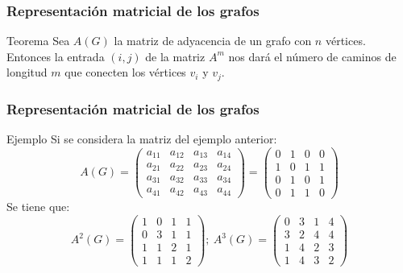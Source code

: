 \documentclass{beamer}
\begin{document}
\begin{frame}
\frametitle{Representaci\'on matricial de los grafos}
\begin{block}{Teorema}
Sea $A(G)$ la matriz de adyacencia de un grafo con $n$ v\'ertices. Entonces la entrada $(i,j)$ de la matriz $A^m$ nos dar\'a el n\'umero de caminos de longitud $m$ que conecten los v\'ertices $v_i$ y $v_j$.  
\end{block}
\end{frame}




\begin{frame}
\frametitle{Representaci\'on matricial de los grafos}
\begin{block}{Ejemplo}
Si se considera la matriz del ejemplo anterior:
\[A(G) = \left(\begin{array}{cccc}a_{11} & a_{12} & a_{13} & a_{14} \\a_{21} & a_{22} & a_{23} & a_{24} \\a_{31} & a_{32} & a_{33} & a_{34} \\a_{41} & a_{42} & a_{43} & a_{44}\end{array}\right) = \left(\begin{array}{cccc}0 & 1 & 0 & 0 \\1 & 0 & 1 & 1 \\0 & 1 & 0 & 1 \\0 & 1 & 1 & 0\end{array}\right)\]
Se tiene que:
\[A^2(G) = \left(\begin{array}{cccc}1 & 0 & 1 & 1 \\0 & 3 & 1 & 1 \\1 & 1 & 2 & 1 \\1 & 1 & 1 & 2\end{array}\right); \ A^3(G) = \left(\begin{array}{cccc}0 & 3 & 1 & 4 \\3 & 2 & 4 & 4 \\1 & 4 & 2 & 3 \\1 & 4 & 3 & 2\end{array}\right)\]

\end{block}
\end{frame}
\end{document}
